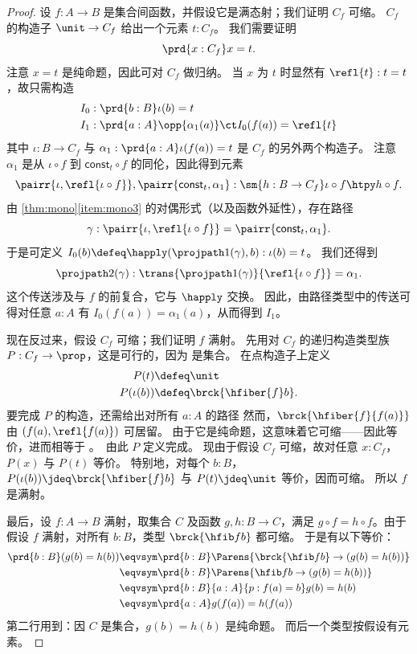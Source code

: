 \begin{proof}
设 $f:A\to B$ 是集合间函数，并假设它是满态射；我们证明 $C_f$ 可缩。
$C_f$ 的构造子 $\unit\to C_f$ 给出一个元素 $t:C_f$。
我们需要证明
\begin{equation*}
\prd{x:C_f} x= t.
\end{equation*}
注意 $x=t$ 是纯命题，因此可对 $C_f$ 做归纳。
当 $x$ 为 $t$ 时显然有 $\refl{t}:t=t$，故只需构造
\begin{align*}
I_0 & : \prd{b:B} \iota(b)= t\\
I_1 & : \prd{a:A} \opp{\alpha_1(a)} \ct I_0(f(a))=\refl{t}
\end{align*}
其中 $\iota:B\to C_f$ 与 $\alpha_1:\prd{a:A} \iota(f(a))= t$ 是 $C_f$ 的另外两个构造子。
注意 $\alpha_1$ 是从 $\iota\circ f$ 到
$\mathsf{const}_t\circ f$ 的同伦，因此得到元素
\begin{equation*}
\pairr{\iota,\refl{\iota\circ f}},\pairr{\mathsf{const}_t,\alpha_1}:
\sm{h:B\to C_f} \iota\circ f \htpy h\circ f.
\end{equation*}
由 \cref{thm:mono}\ref{item:mono3} 的对偶形式（以及函数外延性），存在路径
\begin{equation*}
\gamma:\pairr{\iota,\refl{\iota\circ f}}=\pairr{\mathsf{const}_t,\alpha_1}.
\end{equation*}
于是可定义 $I_0(b)\defeq \happly(\projpath1(\gamma),b):\iota(b)=t$。
我们还得到
\[\projpath2(\gamma) : \trans{\projpath1(\gamma)}{\refl{\iota\circ f}} = \alpha_1. \]
这个传送涉及与 $f$ 的前复合，它与 $\happly$ 交换。
因此，由路径类型中的传送可得对任意 $a:A$ 有 $I_0(f(a)) = \alpha_1(a)$，从而得到 $I_1$。

现在反过来，假设 $C_f$ 可缩；我们证明 $f$ 满射。
先用对 $C_f$ 的递归构造类型族 $P:C_f\to\prop$，这是可行的，因为 \prop 是集合。
在点构造子上定义
\begin{align*}
P(t) & \defeq \unit\\
P(\iota(b)) & \defeq \brck{\hfiber{f}b}.
\end{align*}
要完成 $P$ 的构造，还需给出对所有 $a:A$ 的路径
然而，$\brck{\hfiber{f}{f(a)}}$ 由 $(f(a),\refl{f(a)})$ 可居留。
由于它是纯命题，这意味着它可缩——因此等价，进而相等于 \unit。
由此 $P$ 定义完成。
现由于假设 $C_f$ 可缩，故对任意 $x:C_f$，$P(x)$ 与 $P(t)$ 等价。
特别地，对每个 $b:B$，$P(\iota(b))\jdeq \brck{\hfiber{f}b}$ 与 $P(t)\jdeq \unit$ 等价，因而可缩。
所以 $f$ 是满射。

最后，设 $f:A\to B$ 满射，取集合 $C$ 及函数
$g,h:B\to C$，满足 $g\circ f = h\circ f$。由于假设 $f$
满射，对所有 $b:B$，类型 $\brck{\hfib f b}$ 都可缩。
于是有以下等价：
\begin{align*}
\prd{b:B} (g(b)= h(b))
& \eqvsym \prd{b:B} \Parens{\brck{\hfib f b} \to (g(b)= h(b))}\\
& \eqvsym \prd{b:B} \Parens{\hfib f b \to (g(b)= h(b))}\\
& \eqvsym \prd{b:B}{a:A}{p:f(a)= b} g(b)= h(b)\\
& \eqvsym \prd{a:A} g(f(a))= h(f(a))
\end{align*}
第二行用到：因 $C$ 是集合，$g(b)=h(b)$ 是纯命题。
而后一个类型按假设有元素。
\end{proof}

